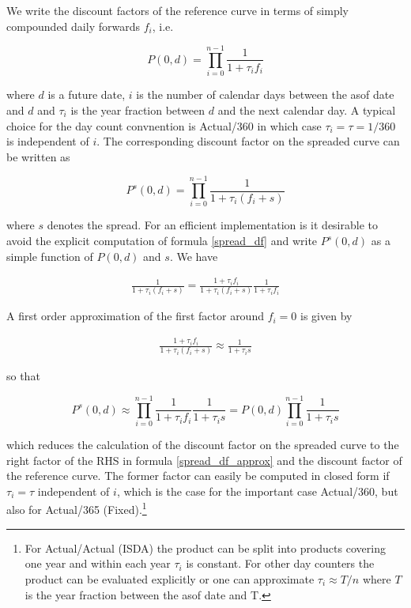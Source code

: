 \documentclass[12pt, a4paper]{article}
\begin{document}
We write the discount factors of the reference curve in terms of simply compounded daily forwards $f_i$, i.e.

\begin{equation}
P(0,d) = \prod_{i=0}^{n-1} \frac{1}{1+\tau_i f_i}
\end{equation}

where $d$ is a future date, $i$ is the number of calendar days between the asof date and $d$ and $\tau_i$ is the year
fraction between $d$ and the next calendar day. A typical choice for the day count convnention is Actual/360 in which
case $\tau_i = \tau = 1 / 360$ is independent of $i$. The corresponding discount factor on the spreaded curve can be
written as

\begin{equation}
\label{spread_df}
P^s(0,d) = \prod_{i=0}^{n-1} \frac{1}{1+\tau_i (f_i + s)}
\end{equation}

where $s$ denotes the spread. For an efficient implementation is it desirable to avoid the explicit computation of
formula \ref{spread_df} and write $P^s(0,d)$ as a simple function of $P(0,d)$ and $s$. We have

\begin{eqnarray*}
  \frac{1}{1+\tau_i (f_i + s)} = \frac{1+\tau_i f_i}{1+\tau_i (f_i + s)} \frac{1}{1+\tau_i f_i}
\end{eqnarray*}

A first order approximation of the first factor around $f_i=0$ is given by

\begin{eqnarray*}
  \frac{1+\tau_i f_i}{1+\tau_i (f_i + s)} \approx \frac{1}{1+\tau_i s}
\end{eqnarray*}

so that

\begin{equation}
 \label{spread_df_approx}
  P^s(0,d) \approx \prod_{i=0}^{n-1} \frac{1}{1+\tau_i f_i} \frac{1}{1+\tau_i s} = P(0,d) \prod_{i=0}^{n-1} \frac{1}{1+\tau_i s}
\end{equation}

which reduces the calculation of the discount factor on the spreaded curve to the right factor of the RHS in formula
\ref{spread_df_approx} and the discount factor of the reference curve. The former factor can easily be computed in
closed form if $\tau_i = \tau$ independent of $i$, which is the case for the important case Actual/360, but also for
Actual/365 (Fixed).\footnote{For Actual/Actual (ISDA) the product can be split into products covering one year and
  within each year $\tau_i$ is constant. For other day counters the product can be evaluated explicitly or one can
  approximate $\tau_i \approx T / n$ where $T$ is the year fraction between the asof date and T.}
\end{document}

